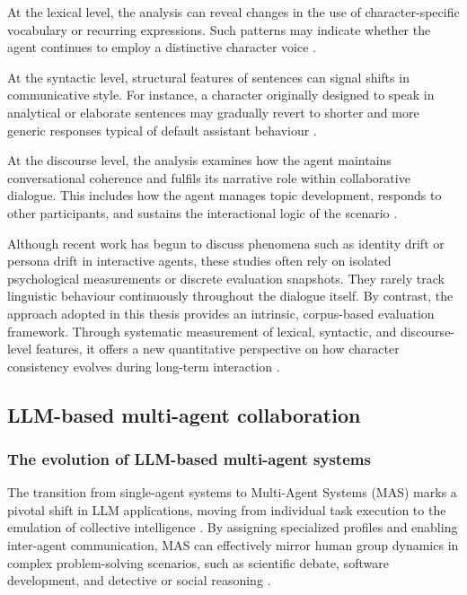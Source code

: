 \documentclass{article}
\begin{document}
At the lexical level, the analysis can reveal changes in the use of character-specific vocabulary or recurring expressions. Such patterns may indicate whether the agent continues to employ a distinctive character voice \citep{zhou2023characterglm, wang2024rolellm}.

At the syntactic level, structural features of sentences can signal shifts in communicative style. For instance, a character originally designed to speak in analytical or elaborate sentences may gradually revert to shorter and more generic responses typical of default assistant behaviour \citep{park2023generative, wang2024rolellm}.

At the discourse level, the analysis examines how the agent maintains conversational coherence and fulfils its narrative role within collaborative dialogue. This includes how the agent manages topic development, responds to other participants, and sustains the interactional logic of the scenario \citep{ji2025enhancing}.

Although recent work has begun to discuss phenomena such as identity drift or persona drift in interactive agents, these studies often rely on isolated psychological measurements or discrete evaluation snapshots. They rarely track linguistic behaviour continuously throughout the dialogue itself. By contrast, the approach adopted in this thesis provides an intrinsic, corpus-based evaluation framework. Through systematic measurement of lexical, syntactic, and discourse-level features, it offers a new quantitative perspective on how character consistency evolves during long-term interaction \citep{choi2024examining}.

\subsection{LLM-based multi-agent collaboration}

\subsubsection{The evolution of LLM-based multi-agent systems}

The transition from single-agent systems to Multi-Agent Systems (MAS) marks a pivotal shift in LLM applications, moving from individual task execution to the emulation of collective intelligence \citep{guo2024review, xi2025review}. By assigning specialized profiles and enabling inter-agent communication, MAS can effectively mirror human group dynamics in complex problem-solving scenarios, such as scientific debate, software development, and detective or social reasoning \citep{xiao2023simulating, guo2024review}.
\end{document}
